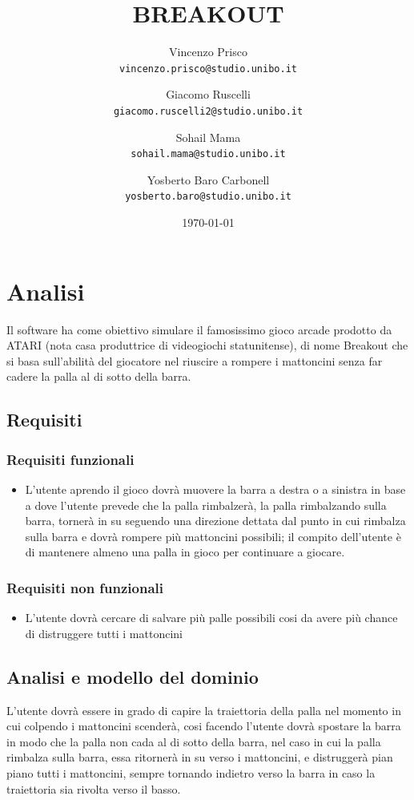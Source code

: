\documentclass[a4paper,12pt]{report}
\title{\textbf{BREAKOUT}}
\author{Vincenzo Prisco\\
\texttt{vincenzo.prisco@studio.unibo.it}
\and Giacomo Ruscelli\\
\texttt{giacomo.ruscelli2@studio.unibo.it}
\and Sohail Mama\\
\texttt{sohail.mama@studio.unibo.it}
\and Yosberto Baro Carbonell\\
\texttt{yosberto.baro@studio.unibo.it}}
\date{\today}
\begin{document}
\maketitle
\newpage

\tableofcontents

\newpage

\chapter{Analisi}
Il software ha come obiettivo simulare il famosissimo gioco arcade prodotto da ATARI (nota casa produttrice di videogiochi statunitense), di nome Breakout che si basa sull’abilità del giocatore nel riuscire a rompere i mattoncini senza far cadere la palla al di sotto della barra.

\section{Requisiti}

\subsection{Requisiti funzionali}
\begin{itemize}
    \item L’utente aprendo il gioco dovrà muovere la barra a destra o a sinistra in base a dove l’utente prevede che la palla rimbalzerà, la palla rimbalzando sulla barra, tornerà in su seguendo una direzione dettata dal punto in cui rimbalza sulla barra e dovrà rompere più mattoncini possibili; il compito dell'utente è di mantenere almeno una palla in gioco per continuare a giocare.
\end{itemize}

\subsection{Requisiti non funzionali}
\begin{itemize}
    \item L'utente dovrà cercare di salvare più palle possibili cosi da avere più chance di distruggere tutti i mattoncini
\end{itemize}
\section{Analisi e modello del dominio}
L'utente dovrà essere in grado di capire la traiettoria della palla nel momento in cui colpendo i mattoncini scenderà, cosi facendo l'utente dovrà spostare la barra in modo che la palla non cada al di sotto della barra, nel caso in cui la palla rimbalza sulla barra, essa ritornerà in su verso i mattoncini, e distruggerà pian piano tutti i mattoncini, sempre tornando indietro verso la barra in caso la traiettoria sia rivolta verso il basso. \newline
\end{document}
